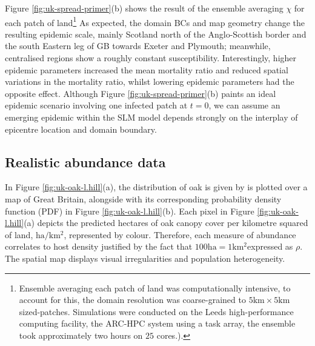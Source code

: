 Figure \ref{fig:uk-spread-primer}(b) shows the result of the ensemble averaging $\chi$ for each
patch of land\footnote{Ensemble averaging each patch of land was computationally intensive, 
to account for this, the domain resolution was coarse-grained to $\mathrm{5km \times 5km}$ sized-patches.
Simulations were conducted on the Leeds high-performance computing facility, the ARC-HPC system using a task %
array, the ensemble took approximately two hours on $25$ cores.).} 
As expected, the domain BCs and map geometry change the resulting epidemic scale, 
mainly Scotland north of the Anglo-Scottish border and the south Eastern leg of GB towards Exeter and Plymouth;
meanwhile, centralised regions show a roughly constant susceptibility. 
Interestingly, higher epidemic parameters increased the mean mortality ratio and reduced spatial variations
in the mortality ratio, whilst lowering epidemic parameters had the opposite effect.
Although Figure \ref{fig:uk-spread-primer}(b) paints an ideal epidemic scenario involving one infected patch at $t=0$,
we can assume an emerging epidemic within the SLM model depends strongly on the interplay of epicentre location and domain boundary.
 
 \newpage

\subsection{Realistic abundance data}

In Figure \ref{fig:uk-oak-l.hill}(a), the distribution of oak is given by \cite{hill.data} is
plotted over a map of Great Britain, alongside with its corresponding 
probability density function (PDF) in  Figure \ref{fig:uk-oak-l.hill}(b).
Each pixel in Figure \ref{fig:uk-oak-l.hill}(a) depicts the predicted hectares
of oak canopy cover per kilometre squared of land, $\mathrm{ha/km^{2}}$, represented by colour. 
Therefore, each measure of abundance correlates to host density\textemdash
justified by the fact that $100\mathrm{ha} = 1 \mathrm{km^2}$\textemdash expressed as $\rho$.
The spatial map displays visual irregularities and population heterogeneity.

